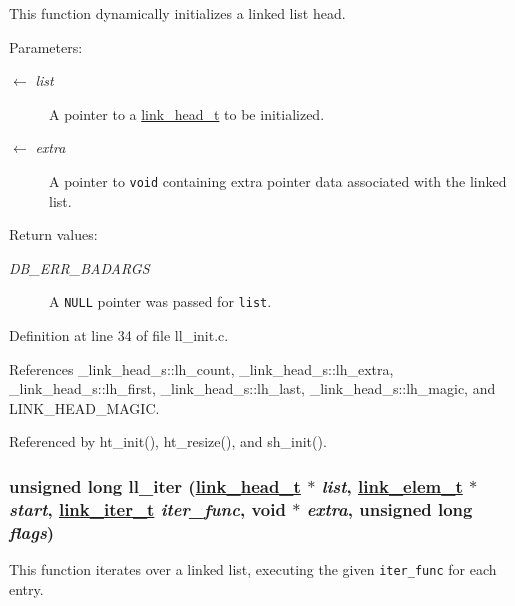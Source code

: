 This function dynamically initializes a linked list head.

\begin{Desc}
\item[Parameters:]
\begin{description}
\item[\mbox{$\leftarrow$} {\em list}]A pointer to a \hyperlink{group__dbprim__link_ga0}{link\_\-head\_\-t} to be initialized. \item[\mbox{$\leftarrow$} {\em extra}]A pointer to {\tt void} containing extra pointer data associated with the linked list.\end{description}
\end{Desc}
\begin{Desc}
\item[Return values:]
\begin{description}
\item[{\em DB\_\-ERR\_\-BADARGS}]A {\tt NULL} pointer was passed for {\tt list}.\end{description}
\end{Desc}


Definition at line 34 of file ll\_\-init.c.

References \_\-link\_\-head\_\-s::lh\_\-count, \_\-link\_\-head\_\-s::lh\_\-extra, \_\-link\_\-head\_\-s::lh\_\-first, \_\-link\_\-head\_\-s::lh\_\-last, \_\-link\_\-head\_\-s::lh\_\-magic, and LINK\_\-HEAD\_\-MAGIC.

Referenced by ht\_\-init(), ht\_\-resize(), and sh\_\-init().\hypertarget{group__dbprim__link_ga10}{
\subsubsection[ll\_\-iter]{\setlength{\rightskip}{0pt plus 5cm}unsigned long ll\_\-iter (\hyperlink{struct__link__head__s}{link\_\-head\_\-t} $\ast$ {\em list}, \hyperlink{struct__link__elem__s}{link\_\-elem\_\-t} $\ast$ {\em start}, \hyperlink{group__dbprim__link_ga2}{link\_\-iter\_\-t} {\em iter\_\-func}, void $\ast$ {\em extra}, unsigned long {\em flags})}}
\label{group__dbprim__link_ga10}


This function iterates over a linked list, executing the given {\tt iter\_\-func} for each entry.

